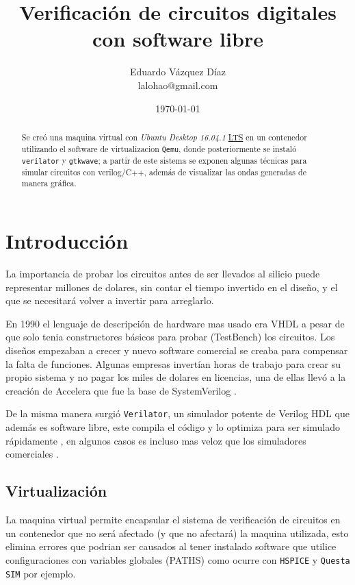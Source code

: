 \documentclass[11pt]{/home/hao/dev/org/latex-plantilla/IEEEtran}
\author{Eduardo Vázquez Díaz \\ lalohao@gmail.com}
\date{\today}
\title{Verificación de circuitos digitales con software libre}
\begin{document}
\maketitle
\tableofcontents

\begin{abstract}
Se creó una maquina virtual con \emph{Ubuntu Desktop 16.04.1} \uline{LTS} en un
contenedor utilizando el software de virtualizacion \texttt{Qemu}, donde
posteriormente se instaló \texttt{verilator} y \texttt{gtkwave}; a partir de este
sistema se exponen algunas técnicas para simular circuitos con
verilog/C++, además de visualizar las ondas generadas de manera
gráfica.
\end{abstract}

\section{Introducción}
\label{sec:org5f51a6c}
La importancia de probar los circuitos antes de ser llevados al
silicio puede representar millones de dolares, sin contar el tiempo
invertido en el diseño, y el que se necesitará volver a invertir
para arreglarlo.

En 1990 el lenguaje de descripción de hardware mas usado era VHDL a
pesar de que solo tenia constructores básicos para probar
(TestBench) los circuitos. Los diseños empezaban a crecer y nuevo
software comercial se creaba para compensar la falta de funciones.
Algunas empresas invertían horas de trabajo para crear su propio
sistema y no pagar los miles de dolares en licencias, una de ellas
llevó a la creación de Accelera que fue la base de SystemVerilog
\cite{spear08_system}.

De la misma manera surgió \texttt{Verilator}, un simulador potente de
Verilog HDL que además es software libre, este compila el código y
lo optimiza para ser simulado rápidamente \cite{verilator-intro}, en
algunos casos es incluso mas veloz que los simuladores comerciales
\cite{verilator-vs-comercial}.

\subsection{Virtualización}
\label{sec:org111b7e3}
La maquina virtual permite encapsular el sistema de verificación de
circuitos en un contenedor que no será afectado (y que no afectará)
la maquina utilizada, esto elimina errores que podrian ser causados
al tener instalado software que utilice configuraciones con
variables globales (PATHS) como ocurre con \texttt{HSPICE} y \texttt{Questa SIM}
por ejemplo.
\end{document}
